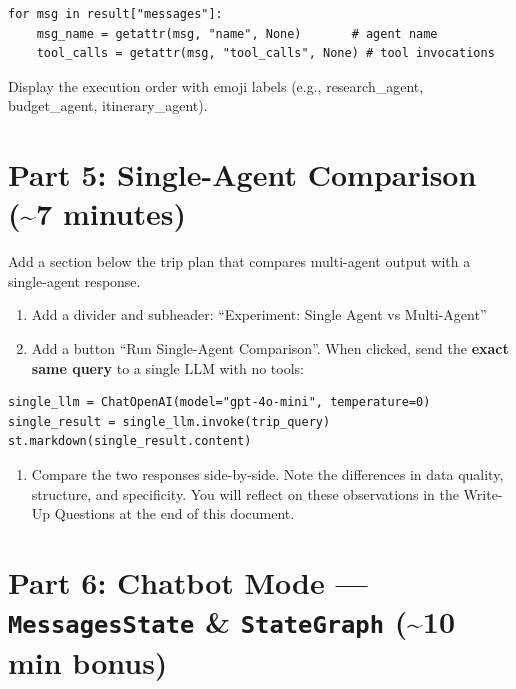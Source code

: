 \documentclass[11pt, letterpaper]{article}
\begin{document}
\begin{lstlisting}
for msg in result["messages"]:
    msg_name = getattr(msg, "name", None)       # agent name
    tool_calls = getattr(msg, "tool_calls", None) # tool invocations
\end{lstlisting}

\noindent Display the execution order with emoji labels (e.g., research\_agent, budget\_agent, itinerary\_agent).

\newpage

\section{Part 5: Single-Agent Comparison \textnormal{(\textasciitilde7 minutes)}}

Add a section below the trip plan that compares multi-agent output with a single-agent response.

\begin{enumerate}[nosep]
  \item Add a divider and subheader: ``Experiment: Single Agent vs Multi-Agent''
  \item Add a button ``Run Single-Agent Comparison''. When clicked, send the \textbf{exact same query} to a single LLM with no tools:
\end{enumerate}

\begin{lstlisting}
single_llm = ChatOpenAI(model="gpt-4o-mini", temperature=0)
single_result = single_llm.invoke(trip_query)
st.markdown(single_result.content)
\end{lstlisting}

\begin{enumerate}[nosep, start=3]
  \item Compare the two responses side-by-side. Note the differences in data quality, structure, and specificity. You will reflect on these observations in the Write-Up Questions at the end of this document.
\end{enumerate}


\section{Part 6: Chatbot Mode --- \texttt{MessagesState} \& \texttt{StateGraph} \textnormal{(\textasciitilde10 min bonus)}}
\end{document}
